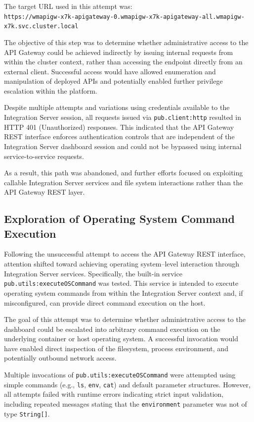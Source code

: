 \documentclass[12pt,a4paper]{report}
\begin{document}
The target URL used in this attempt was:\\
\texttt{https://wmapigw-x7k-apigateway-0.wmapigw-x7k-apigateway-all.wmapigw-x7k.svc.cluster.local}

The objective of this step was to determine whether administrative access to the API Gateway could be achieved indirectly by issuing internal requests from within the cluster context, rather than accessing the endpoint directly from an external client. Successful access would have allowed enumeration and manipulation of deployed APIs and potentially enabled further privilege escalation within the platform.

Despite multiple attempts and variations using credentials available to the Integration Server session, all requests issued via \texttt{pub.client:http} resulted in HTTP 401 (Unauthorized) responses. This indicated that the API Gateway REST interface enforces authentication controls that are independent of the Integration Server dashboard session and could not be bypassed using internal service-to-service requests.

As a result, this path was abandoned, and further efforts focused on exploiting callable Integration Server services and file system interactions rather than the API Gateway REST layer.


\subsection{Exploration of Operating System Command Execution}
Following the unsuccessful attempt to access the API Gateway REST interface, attention shifted toward achieving operating system–level interaction through Integration Server services. Specifically, the built-in service \texttt{pub.utils:executeOSCommand} was tested. This service is intended to execute operating system commands from within the Integration Server context and, if misconfigured, can provide direct command execution on the host.

The goal of this attempt was to determine whether administrative access to the dashboard could be escalated into arbitrary command execution on the underlying container or host operating system. A successful invocation would have enabled direct inspection of the filesystem, process environment, and potentially outbound network access.

Multiple invocations of \texttt{pub.utils:executeOSCommand} were attempted using simple commands (e.g., \texttt{ls}, \texttt{env}, \texttt{cat}) and default parameter structures. However, all attempts failed with runtime errors indicating strict input validation, including repeated messages stating that the \texttt{environment} parameter was not of type \texttt{String[]}.
\end{document}
